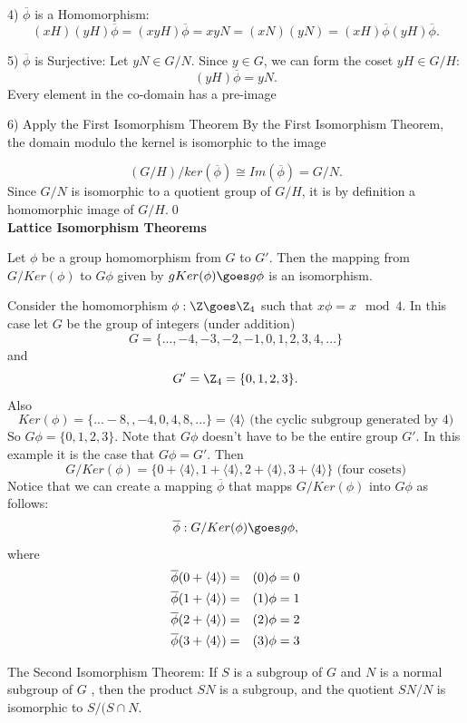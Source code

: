 4) $\overline{\phi}$ is a Homomorphism:
\[ (xH) (yH) \overline{\phi} = (xyH)\overline{\phi} = xyN = (xN)(yN) = (xH)\overline{\phi} (yH)\overline{\phi}.\]

5) $\overline{\phi}$ is Surjective:
Let $yN \in G/N$. 
Since $y\in G$, we can form the coset $yH \in G/H$:
\[ (yH)\overline{\phi} = yN.\] Every element in the co-domain has a pre-image
 
6) Apply the First Isomorphism Theorem
By the First Isomorphism Theorem, the domain modulo the kernel is isomorphic to the image

\[ (G/H)/ker(\overline{\phi}) \cong Im(\overline{\phi}) = G/N .\]
Since $G/N$ is isomorphic to a quotient group of $G/H$, it is by definition a homomorphic image of $G/H$.\qed \\

{\bf Lattice Isomorphism Theorems}
 
\begin{theorem}  Let $\phi$ be a group homomorphism from $G$ to $G'$. Then the mapping from $G/Ker(\phi)$ to $G\phi$ given by 
$g Ker(\phi) \goes g\phi$ is an isomorphism.
\end{theorem}
\begin{example}Consider the homomorphism $\phi: \Z \goes \Z_4$ such that $x\phi = x\mod4$.
In this case let $G$ be the group of integers (under addition) \[ G = \{..., -4, -3, -2, -1, 0, 1, 2, 3, 4, ...\}\] 
and \[ G' = \Z_4 = \{ 0, 1, 2, 3\}. \]
Also \[ Ker(\phi) = \{ ...-8, ,-4, 0, 4, 8, ...\} = \langle4\rangle \mbox{   (the cyclic subgroup generated by 4)} \] 
So $G\phi = \{ 0, 1, 2, 3\}$. Note that $G\phi$ doesn't have to be the entire group $G'$. In this example it is the case that $G\phi = G'$.
Then \[ G/ Ker(\phi) = \{ 0 + \langle4\rangle, 1 + \langle4\rangle, 2 + \langle4\rangle, 3+\langle4\rangle \} \mbox{   (four cosets)}\]
Notice that we can create a mapping $\overline{\phi}$ that mapps $G/Ker(\phi)$ into $G\phi$ as follows: 
\[ \overline{\phi}: G/Ker(\phi) \goes g\phi, \] where
\begin{eqnarray*}
\overline{\phi}(0+\langle4\rangle) &=& (0)\phi = 0\cr
\overline{\phi}(1+\langle4\rangle) &=& (1)\phi = 1\cr
\overline{\phi}(2+\langle4\rangle) &=& (2)\phi = 2\cr
\overline{\phi}(3+\langle4\rangle) &=& (3)\phi = 3
\end{eqnarray*}
\end{example}

\begin{theorem}  The Second Isomorphism Theorem: If  $S$
 is a subgroup of $G$  and $N$  is a normal subgroup of $G$ , then the product $SN$ is a subgroup, and the quotient 
$SN / N$  is isomorphic to  $S / (S \cap N$.\end{theorem}

